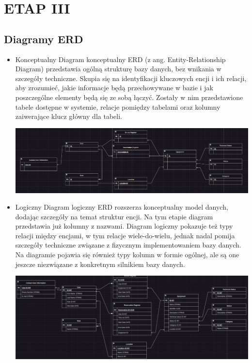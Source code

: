 \documentclass{article}
\begin{document}
\section{\textbf{ETAP III}}

\subsection{\textbf{Diagramy ERD}}
  \begin{itemize}
    \item Konceptualny 
          Diagram konceptualny ERD (z ang. Entity-Relationship Diagram) przedstawia ogólną strukturę bazy danych, bez wnikania w szczegóły techniczne. Skupia się na identyfikacji kluczowych encji i ich relacji, aby zrozumieć, jakie informacje będą przechowywane w bazie i jak poszczególne elementy będą się ze sobą łączyć. Zostały w nim przedstawione tabele dostępne w systemie, relacje pomiędzy tabelami oraz kolumny zaiwerające klucz główny dla tabeli.   
    
    \includegraphics[width=\textwidth]{media/conceptual_erd.png}

    \item Logiczny
          Diagram logiczny ERD rozszerza konceptualny model danych, dodając szczegóły na temat struktur encji. Na tym etapie diagram przedstawia już kolumny z nazwami. Diagram logiczny pokazuje też typy relacji między encjami, w tym relacje wiele-do-wielu, jednak nadal pomija szczegóły techniczne związane z fizycznym implementowaniem bazy danych. Na diagramie pojawia się również typy kolumn w formie ogólnej, ale są one jeszcze niezwiązane z konkretnym silnikiem bazy danych.

     \includegraphics[width=\textwidth]{media/logical_erd.png}


\end{itemize}
\end{document}
